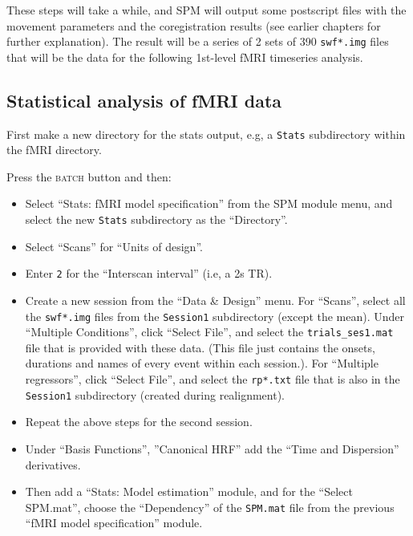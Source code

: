 These steps will take a while, and SPM will output some postscript files with the movement parameters and the coregistration results (see earlier chapters for further explanation). The result will be a series of 2 sets of 390 \texttt{swf*.img} files that will be the data for the following 1st-level fMRI timeseries analysis.

\subsection{Statistical analysis of fMRI data}

First make a new directory for the stats output, e.g, a \texttt{Stats} subdirectory within the fMRI directory.

Press the \textsc{batch} button and then:

\begin{itemize}

\item Select ``Stats: fMRI model specification'' from the SPM module menu, and select the new \texttt{Stats} subdirectory as the ``Directory''.

\item Select ``Scans'' for ``Units of design''.

\item Enter \texttt{2} for the ``Interscan interval'' (i.e, a 2s TR).

\item Create a new session from the ``Data \& Design'' menu. For ``Scans'', select all the \texttt{swf*.img} files from the \texttt{Session1} subdirectory (except the mean). Under ``Multiple Conditions'', click ``Select File'', and select the \texttt{trials\_ses1.mat} file that is provided with these data. (This file just contains the onsets, durations and names of every event within each session.). For ``Multiple regressors'', click ``Select File'', and select the \texttt{rp*.txt} file that is also in the \texttt{Session1} subdirectory (created during realignment).

\item Repeat the above steps for the second session.

\item Under ``Basis Functions'', ''Canonical HRF'' add the ``Time and Dispersion'' derivatives.

\item Then add a ``Stats: Model estimation'' module, and for the ``Select SPM.mat'', choose the ``Dependency'' of the \texttt{SPM.mat} file from the previous ``fMRI model specification'' module.


\end{itemize}
